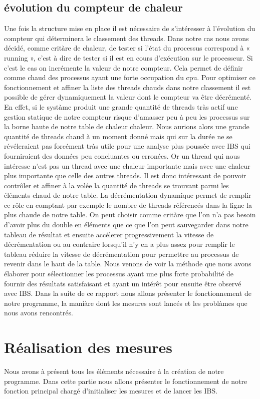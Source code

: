 		\subsection{évolution du compteur de chaleur}
			Une fois la structure mise en place il est nécessaire de s’intéresser à l'évolution du compteur qui déterminera le classement des threads.
			Dans notre cas nous avons décidé, comme critàre de chaleur, de tester si l'état du processus correspond à
			« running », c'est à dire de tester si il est en cours d’exécution sur le processeur. Si c'est le cas on incrémente la valeur de notre compteur. Cela permet de définir comme chaud des processus ayant une forte occupation du cpu.
			Pour optimiser ce fonctionnement et affiner la liste des threads chauds dans notre classement il est possible de gérer dynamiquement la valeur dont le compteur va être décrémenté. En effet, si le systàme produit une grande quantité de threads tràs actif une gestion statique de notre compteur risque d'amasser peu à peu les processus sur la borne haute de notre table de chaleur chaleur. Nous aurions alors une grande quantité de threads chaud à un moment donné mais qui sur la durée ne se révéleraient pas forcément tràs utile pour une analyse plus poussée avec IBS qui fourniraient des données peu concluantes ou erronées.
			Or un thread qui nous intéresse n'est pas un thread avec une chaleur importante mais avec une chaleur plus importante que celle des autres threads. Il est donc intéressant de pouvoir contrôler et affiner à la volée la quantité de threads se trouvant parmi les éléments chaud de notre table. La décrémentation dynamique permet de remplir ce rôle en comptant par exemple le nombre de threads référencés dans la ligne la plus chaude de notre table. On peut choisir comme critàre que l'on n'a pas besoin d'avoir plus du double en éléments que ce que l'on peut sauvegarder dans notre tableau de résultat et ensuite accélerer progressivement la vitesse de décrémentation ou au contraire lorsqu'il n'y en a plus assez pour remplir le tableau réduire la vitesse de décrémentation pour permettre au processus de revenir dans le haut de la table.
			Nous venons de voir la méthode que nous avons élaborer pour sélectionner les processus ayant une plus forte probabilité de fournir des résultats satisfaisant et ayant un intérêt pour ensuite être observé avec IBS. Dans la suite de ce rapport nous allons présenter le fonctionnement de notre programme, la maniàre dont les mesures sont lancés et les problàmes que nous avons rencontrés.	
	\section{Réalisation des mesures}
			Nous avons à présent tous les éléments nécessaire à la création de notre programme. Dans cette partie nous allons présenter le fonctionnement de notre fonction principal chargé d'initialiser les mesures et de lancer les IBS.
